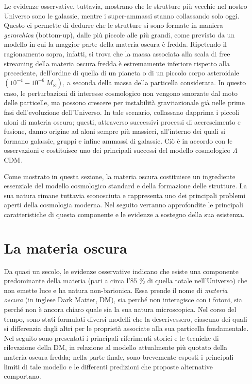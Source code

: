 Le evidenze osservative, tuttavia, mostrano che le strutture più vecchie nel nostro Universo sono le galassie, mentre i super-ammassi stanno collassando solo oggi. Questo ci permette di dedurre che le strutture si sono formate in maniera \emph{gerarchica} (bottom-up), dalle più piccole alle più grandi, come previsto da un modello in cui la maggior parte della materia oscura è fredda. Ripetendo il ragionamento sopra, infatti, si trova che la massa associata alla scala di free streaming della materia oscura fredda è estremamente inferiore rispetto alla precedente, dell'ordine di quella di un pianeta o di un piccolo corpo asteroidale $(10^{-4}-10^{-6}\ M_\odot)$, a seconda della massa della particella considerata. 
In questo caso, le perturbazioni di interesse cosmologico non vengono smorzate dal moto delle particelle, ma possono crescere per instabilità gravitazionale già nelle prime fasi dell'evoluzione dell'Universo. In tale scenario, collassano dapprima i piccoli aloni di materia oscura; questi, attraverso successivi processi di accrescimento e fusione, danno origine ad aloni sempre più massicci, all'interno dei quali si formano galassie, gruppi e infine ammassi di galassie. Ciò è in accordo con le osservazioni e costituisce uno dei principali successi del modello cosmologico $\Lambda$CDM. 

Come mostrato in questa sezione, la materia oscura costituisce un ingrediente essenziale del modello cosmologico standard e della formazione delle strutture. La sua natura rimane tuttavia sconosciuta e rappresenta uno dei principali problemi aperti della cosmologia moderna. Nel seguito verranno approfondite le principali caratteristiche di questa componente e le evidenze a sostegno della sua esistenza.

\section{La materia oscura}
Da quasi un secolo, le evidenze osservative indicano che esiste una componente predominante della materia (pari a circa l'85 \% di quella totale nell'Universo) che non emette luce e ha natura non-barionica. Essa prende il nome di \emph{materia oscura} (in inglese Dark Matter, DM), sia perché non interagisce con i fotoni, sia perché non è ancora chiaro quale sia la sua natura microscopica. Nel corso del tempo, sono stati formulati diversi modelli che la descrivessero, ciascuno dei quali si differenzia dagli altri per le proprietà associate alla sua particella fondamentale. Nel seguito sono presentati i principali riferimenti storici e le tecniche di rilevazione della DM, in relazione al modello attualmente più quotato della materia oscura fredda; nella parte finale, sono brevemente esposti i principali limiti di tale modello e le differenti predizioni che proposte alternative comportano. 
